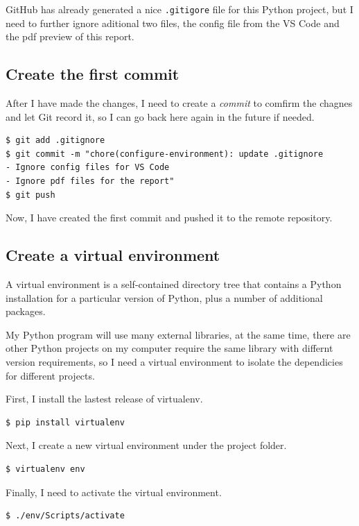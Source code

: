 \documentclass[a4paper]{report}
\begin{document}
GitHub has already generated a nice \texttt{.gitigore} file for this Python project, but I need to further ignore aditional two files, the config file from the VS Code and the pdf preview of this report.

\subsection{Create the first commit}

After I have made the changes, I need to create a \emph{commit} to comfirm the chagnes and let Git record it, so I can go back here again in the future if needed.

\begin{verbatim}
$ git add .gitignore
$ git commit -m "chore(configure-environment): update .gitignore
- Ignore config files for VS Code
- Ignore pdf files for the report"
$ git push
\end{verbatim}

Now, I have created the first commit and pushed it to the remote repository.

\subsection{Create a virtual environment}

A virtual environment is a self-contained directory tree that contains a Python installation for a particular version of Python, plus a number of additional packages.

My Python program will use many external libraries, at the same time, there are other Python projects on my computer require the same library with differnt version requirements, so I need a virtual environment to isolate the dependicies for different projects.

First, I install the lastest release of virtualenv.

\begin{verbatim}
$ pip install virtualenv
\end{verbatim}

Next, I create a new virtual environment under the project folder.

\begin{verbatim}
$ virtualenv env
\end{verbatim}

Finally, I need to activate the virtual environment.

\begin{verbatim}
$ ./env/Scripts/activate
\end{verbatim}
\end{document}
